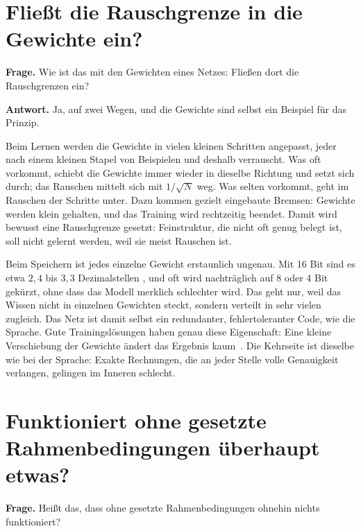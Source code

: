 \section{Fließt die Rauschgrenze in die Gewichte ein?}

\textbf{Frage.} Wie ist das mit den Gewichten eines Netzes: Fließen dort die Rauschgrenzen ein?

\textbf{Antwort.} Ja, auf zwei Wegen, und die Gewichte sind selbst ein Beispiel für das Prinzip.

Beim Lernen werden die Gewichte in vielen kleinen Schritten angepasst, jeder nach einem kleinen Stapel
von Beispielen und deshalb verrauscht. Was oft vorkommt, schiebt die Gewichte immer wieder in dieselbe
Richtung und setzt sich durch; das Rauschen mittelt sich mit $1/\sqrt N$ weg. Was selten vorkommt,
geht im Rauschen der Schritte unter. Dazu kommen gezielt eingebaute Bremsen: Gewichte werden klein
gehalten, und das Training wird rechtzeitig beendet. Damit wird bewusst eine Rauschgrenze gesetzt:
Feinstruktur, die nicht oft genug belegt ist, soll nicht gelernt werden, weil sie meist Rauschen ist.

Beim Speichern ist jedes einzelne Gewicht erstaunlich ungenau. Mit 16 Bit sind es etwa $2{,}4$ bis
$3{,}3$ Dezimalstellen \KM, und oft wird nachträglich auf 8 oder 4 Bit gekürzt, ohne dass das Modell
merklich schlechter wird. Das geht nur, weil das Wissen nicht in einzelnen Gewichten steckt, sondern
verteilt in sehr vielen zugleich. Das Netz ist damit selbst ein redundanter, fehlertoleranter Code,
wie die Sprache. Gute Trainingslösungen haben genau diese Eigenschaft: Eine kleine Verschiebung der
Gewichte ändert das Ergebnis kaum \QM\,\cite{Hochreiter1997}. Die Kehrseite ist dieselbe wie bei der
Sprache: Exakte Rechnungen, die an jeder Stelle volle Genauigkeit verlangen, gelingen im Inneren
schlecht.

\section{Funktioniert ohne gesetzte Rahmenbedingungen überhaupt etwas?}

\textbf{Frage.} Heißt das, dass ohne gesetzte Rahmenbedingungen ohnehin nichts funktioniert?

